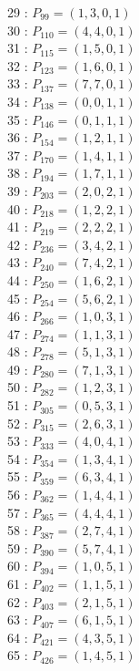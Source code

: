 \documentclass{article}
\begin{document}
{\begin{multicols}{3}
29 : $P_{99}=( 1, 3, 0, 1 )$\\
30 : $P_{110}=( 4, 4, 0, 1 )$\\
31 : $P_{115}=( 1, 5, 0, 1 )$\\
32 : $P_{123}=( 1, 6, 0, 1 )$\\
33 : $P_{137}=( 7, 7, 0, 1 )$\\
34 : $P_{138}=( 0, 0, 1, 1 )$\\
35 : $P_{146}=( 0, 1, 1, 1 )$\\
36 : $P_{154}=( 1, 2, 1, 1 )$\\
37 : $P_{170}=( 1, 4, 1, 1 )$\\
38 : $P_{194}=( 1, 7, 1, 1 )$\\
39 : $P_{203}=( 2, 0, 2, 1 )$\\
40 : $P_{218}=( 1, 2, 2, 1 )$\\
41 : $P_{219}=( 2, 2, 2, 1 )$\\
42 : $P_{236}=( 3, 4, 2, 1 )$\\
43 : $P_{240}=( 7, 4, 2, 1 )$\\
44 : $P_{250}=( 1, 6, 2, 1 )$\\
45 : $P_{254}=( 5, 6, 2, 1 )$\\
46 : $P_{266}=( 1, 0, 3, 1 )$\\
47 : $P_{274}=( 1, 1, 3, 1 )$\\
48 : $P_{278}=( 5, 1, 3, 1 )$\\
49 : $P_{280}=( 7, 1, 3, 1 )$\\
50 : $P_{282}=( 1, 2, 3, 1 )$\\
51 : $P_{305}=( 0, 5, 3, 1 )$\\
52 : $P_{315}=( 2, 6, 3, 1 )$\\
53 : $P_{333}=( 4, 0, 4, 1 )$\\
54 : $P_{354}=( 1, 3, 4, 1 )$\\
55 : $P_{359}=( 6, 3, 4, 1 )$\\
56 : $P_{362}=( 1, 4, 4, 1 )$\\
57 : $P_{365}=( 4, 4, 4, 1 )$\\
58 : $P_{387}=( 2, 7, 4, 1 )$\\
59 : $P_{390}=( 5, 7, 4, 1 )$\\
60 : $P_{394}=( 1, 0, 5, 1 )$\\
61 : $P_{402}=( 1, 1, 5, 1 )$\\
62 : $P_{403}=( 2, 1, 5, 1 )$\\
63 : $P_{407}=( 6, 1, 5, 1 )$\\
64 : $P_{421}=( 4, 3, 5, 1 )$\\
65 : $P_{426}=( 1, 4, 5, 1 )$\\

\end{multicols}}
\end{document}
